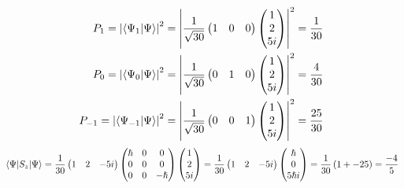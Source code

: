 \documentclass[10pt]{article} %
\begin{document}
\begin{align*}
  P_{1} = \abs{\braket{\Psi_{1}}{\Psi}}^2 &=
  \abs{\frac{1}{\sqrt{30}}\begin{pmatrix}1&0&0\end{pmatrix}\begin{pmatrix}1\\2\\5i\\\end{pmatrix}}^2
  = \frac{1}{30}\\
  P_{0} = \abs{\braket{\Psi_{0}}{\Psi}}^2 &=
  \abs{\frac{1}{\sqrt{30}}\begin{pmatrix}0&1&0\end{pmatrix}\begin{pmatrix}1\\2\\5i\\\end{pmatrix}}^2
  = \frac{4}{30}\\
  P_{-1} = \abs{\braket{\Psi_{-1}}{\Psi}}^2 &=
  \abs{\frac{1}{\sqrt{30}}\begin{pmatrix}0&0&1\end{pmatrix}\begin{pmatrix}1\\2\\5i\\\end{pmatrix}}^2
  = \frac{25}{30}\\
\end{align*}
\begin{align*}
  \expval{S_z}{\Psi} &= \frac{1}{30}\begin{pmatrix}1&2&-5i\end{pmatrix}\begin{pmatrix}
      \hslash&0&0\\0&0&0\\0&0&-\hslash\\\end{pmatrix}\begin{pmatrix}1\\2\\5i\end{pmatrix}
        = \frac{1}{30}\begin{pmatrix}1&2&-5i\end{pmatrix}
          \begin{pmatrix}\hslash\\0\\5\hslash i\end{pmatrix}
            = \frac{1}{30}\left(1 + -25\right) = \frac{-4}{5}\\
\end{align*}
\end{document}
